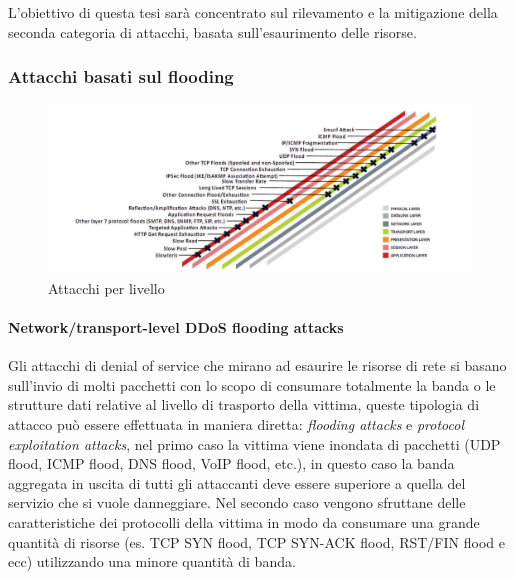 L'obiettivo di questa tesi sarà concentrato sul rilevamento e la mitigazione della seconda categoria di attacchi, basata sull'esaurimento delle risorse.

\subsubsection{Attacchi basati sul flooding}

\begin{figure}[h]
    \includegraphics[width=\hsize]{images/introduzione/attacchi_per_livello.png}
    \caption{Attacchi per livello \cite{ddos_survey_4}}
    \centering
\end{figure}

\paragraph{Network/transport-level DDoS flooding attacks} %
Gli attacchi di denial of service che mirano ad esaurire le risorse di rete si basano sull'invio di molti pacchetti con lo scopo di consumare totalmente la banda o le strutture dati relative al livello di trasporto della vittima, queste tipologia di attacco può essere effettuata in maniera diretta: \emph{flooding attacks} e \emph{protocol exploitation attacks}, nel primo caso la vittima viene inondata di pacchetti (UDP flood, ICMP flood, DNS flood, VoIP flood, etc.), in questo caso la banda aggregata in uscita di tutti gli attaccanti deve essere superiore a quella del servizio che si vuole danneggiare. Nel secondo caso vengono sfruttane delle caratteristiche dei protocolli della vittima in modo da consumare una grande quantità di risorse (es. TCP SYN flood, TCP SYN-ACK flood, RST/FIN flood e ecc) utilizzando una minore quantità di banda.

